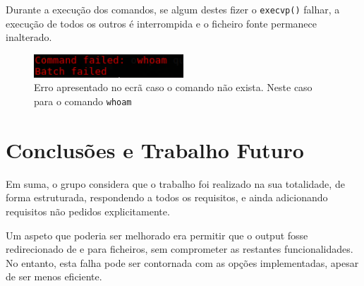 \documentclass[12pt,a4paper]{report}
\begin{document}
    Durante a execução dos comandos, se algum destes fizer o
    \texttt{execvp()} falhar, a execução de todos os outros é interrompida
    e o ficheiro fonte permanece inalterado.

    \begin{figure}[h]
        \centering
        \includegraphics[width=0.5\textwidth]{./images/execError.png}
        \caption{Erro apresentado no ecrã caso o comando não exista. Neste caso
                    para o comando \texttt{whoam}}
    \end{figure}

\chapter{Conclusões e Trabalho Futuro}
    Em suma, o grupo considera que o trabalho foi realizado na sua
    totalidade, de forma estruturada, respondendo a todos os requisitos, e ainda
    adicionando requisitos não pedidos explicitamente.

    Um aspeto que poderia ser melhorado era permitir que o output fosse
    redirecionado de e para ficheiros, sem comprometer as restantes
    funcionalidades. No entanto, esta falha pode ser contornada com as opções
    implementadas, apesar de ser menos eficiente.
\end{document}
